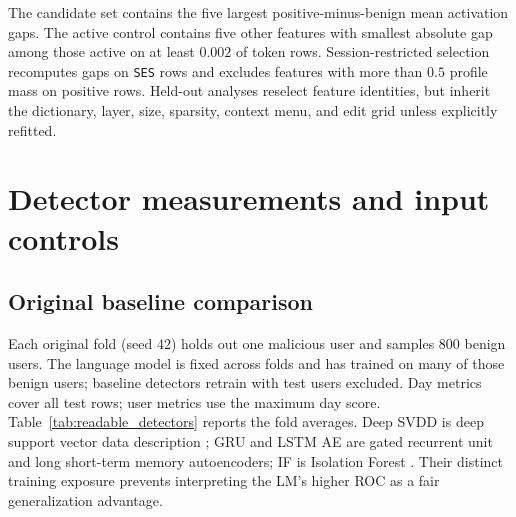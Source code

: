 The candidate set contains the five largest positive-minus-benign mean
activation gaps. The active control contains five other features with
smallest absolute gap among those active on at least $0.002$ of token
rows. Session-restricted selection recomputes gaps on \texttt{SES} rows
and excludes features with more than $0.5$ profile mass on positive rows.
Held-out analyses reselect feature identities, but inherit the dictionary,
layer, size, sparsity, context menu, and edit grid unless explicitly refitted.

\section{Detector measurements and input controls}
\label{app:detectors}

\subsection{Original baseline comparison}

Each original fold (seed $42$) holds out one malicious user and samples
$800$ benign users. The language model is fixed across folds and has
trained on many of those benign users; baseline detectors retrain with
test users excluded. Day metrics cover all test rows; user metrics use
the maximum day score. Table~\ref{tab:readable_detectors} reports the
fold averages. Deep SVDD is deep support vector data description
\citep{ruff2018deepsvdd}; GRU and LSTM AE are gated recurrent unit and
long short-term memory autoencoders; IF is Isolation Forest
\citep{liu2008isolation}. Their distinct training exposure prevents
interpreting the LM's higher ROC as a fair generalization advantage.

